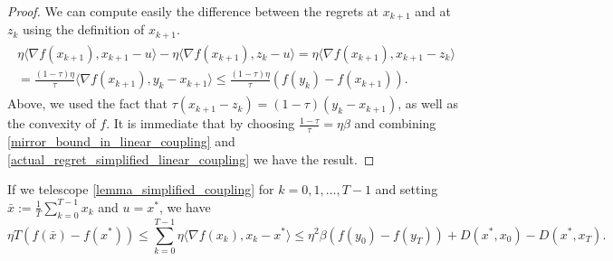 \begin{proof}
    We can compute easily the difference between the regrets at $x_{k+1}$ and at $z_k$ using the definition of $x_{k+1}$.
    \begin{align}\label{actual_regret_simplified_linear_coupling}
        \begin{aligned}
            \eta \langle \nabla f(x_{k+1}), x_{k+1} - u \rangle - \eta \langle \nabla f(x_{k+1}), z_k - u \rangle = \eta \langle \nabla f(x_{k+1}), x_{k+1} - z_k \rangle  \\
            = \frac{(1-\tau)\eta}{\tau} \langle \nabla f(x_{k+1}), y_k - x_{k+1} \rangle \leq \frac{(1-\tau)\eta}{\tau} (f(y_k) - f(x_{k+1})).
        \end{aligned}
    \end{align}
    Above, we used the fact that $\tau(x_{k+1} - z_k) = (1-\tau)(y_k -x_{k+1})$, as well as the convexity of $f$. It is immediate that by choosing $\frac{1-\tau}{\tau} = \eta \beta$ and combining \eqref{mirror_bound_in_linear_coupling} and \eqref{actual_regret_simplified_linear_coupling} we have the result.
\end{proof}

If we telescope \ref{lemma_simplified_coupling} for $k= 0, 1, \dots, T-1$ and setting $\bar{x} := \frac{1}{T} \sum_{k=0}^{T-1} x_k$  and $u = x^\ast$, we have
\begin{equation}\label{final_lemma_simplified_coupling}
    \eta T \left( f(\bar{x}) - f(x^\ast) \right)\leq \sum_{k=0}^{T-1} \eta \langle \nabla f(x_k), x_k - x^\ast \rangle \leq \eta^2 \beta \left( f(y_0) - f(y_T) \right) + D(x^\ast, x_0) - D(x^\ast, {x_T}).
\end{equation}

